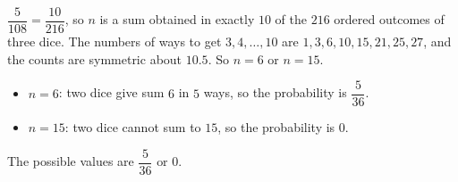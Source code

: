$\dfrac5{108}=\dfrac{10}{216}$, so $n$ is a sum obtained in exactly $10$ of the $216$ ordered outcomes of three dice. The numbers of ways to get $3,4,\dots,10$ are $1,3,6,10,15,21,25,27$, and the counts are symmetric about $10.5$. So $n=6$ or $n=15$.
\begin{itemize}
\item $n=6$: two dice give sum $6$ in $5$ ways, so the probability is $\dfrac5{36}$.
\item $n=15$: two dice cannot sum to $15$, so the probability is $0$.
\end{itemize}
The possible values are $\boxed{\dfrac5{36}\text{ or }0}$.
